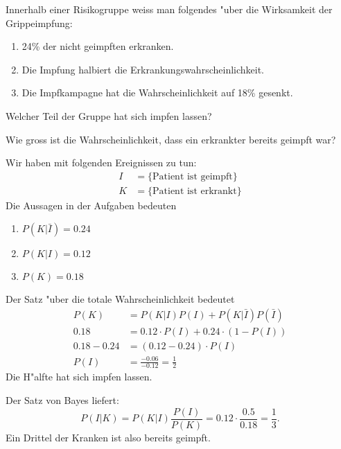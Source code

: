 Innerhalb einer Risikogruppe weiss man folgendes "uber die Wirksamkeit
der Grippeimpfung:
\begin{enumerate}
\item 24\% der nicht geimpften erkranken.
\item Die Impfung halbiert die Erkrankungswahrscheinlichkeit.
\item Die Impfkampagne hat die Wahrscheinlichkeit
auf 18\% gesenkt.
\end{enumerate}
\begin{teilaufgaben}
\item Welcher Teil der Gruppe hat sich impfen lassen?
\item Wie gross ist die Wahrscheinlichkeit, dass ein erkrankter
bereits geimpft war?
\end{teilaufgaben}

\begin{loesung}
Wir haben mit folgenden Ereignissen zu tun:
\begin{align*}
I&=\{\text{Patient ist geimpft}\}\\
K&=\{\text{Patient ist erkrankt}\}
\end{align*}
Die Aussagen in der Aufgaben bedeuten
\begin{enumerate}
\item $P(K|\bar I)=0.24$
\item $P(K|I)=0.12$
\item $P(K)=0.18$
\end{enumerate}
\begin{teilaufgaben}
\item
Der Satz "uber die totale Wahrscheinlichkeit bedeutet
\begin{align*}
P(K)&=P(K|I)P(I)+P(K|\bar I)P(\bar I)
\\
0.18&=0.12\cdot P(I)+0.24\cdot (1-P(I))
\\
0.18-0.24&=(0.12-0.24)\cdot P(I)
\\
P(I)&=\frac{-0.06}{-0.12}=\frac12
\end{align*}
Die H"alfte hat sich impfen lassen.
\item
Der Satz von Bayes liefert:
\[
P(I|K)=P(K|I)\frac{P(I)}{P(K)}=0.12\cdot\frac{0.5}{0.18}=\frac13.
\]
Ein Drittel der Kranken ist also bereits geimpft.
\end{teilaufgaben}
\end{loesung}


